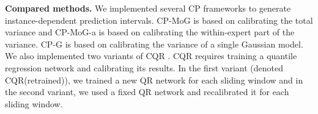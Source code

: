 

{\bf Compared methods.} 
We implemented several CP frameworks to generate instance-dependent prediction intervals.
CP-MoG is based on calibrating the total variance and CP-MoG-a is based on calibrating the within-expert part of the variance. 
CP-G is based on calibrating the variance of a single Gaussian model.
We also implemented two variants of  CQR \cite{cqr2019}. CQR requires training a quantile regression network and calibrating its results.
In the first variant (denoted CQR(retrained)), we trained a new QR network for each sliding window and in the second variant, we used a fixed QR network and recalibrated it for each sliding window.


